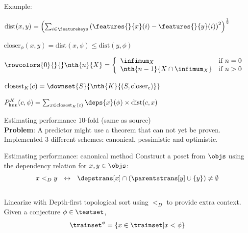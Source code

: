 \begin{frame}{Example: \knn}
	\begin{definition}
		$ \text{dist}(x, y) = \left( \sum_{i \in \featurekeys} \left( \features{}{x}(i) - \features{}{y}(i) \right)^2 \right)^{\frac{1}{2}} $
	\end{definition}
	\bigskip
	\begin{definition}
	$ \text{closer}_\phi(x, y) = \text{dist}(x, \phi) \leq \text{dist}(y, \phi) $
	\end{definition}
	\bigskip
	\begin{definition}
	$
	\rowcolors{0}{}{}
    \nth{n}{X} = \left\{
      \begin{array}{ll}
        \infimum_X & \text{if}~n = 0 \\
        \nth{n-1}{X \cap \infimum_X} & \text{if}~n > 0 \\
      \end{array}
    \right.
	$
	\end{definition}
	\bigskip
	\begin{definition}
	$
    \text{closest}_K(c) = \downset{S}{\nth{K}{(S, \text{closer}_c)}}
	$
	\end{definition}
	\pause
	\bigskip
	\begin{definition}[\knn]
	$
    	P^K_\text{knn}(c, \phi) = \sum_{x \in \text{closest}_K(c)} \deps{x}(\phi) \times \text{dist}(c, x)
	$
	\end{definition}
\end{frame}

\begin{frame}{Estimating performance}
	10-fold \crossvalidation (same as source)\\
	\bigskip
	\textbf{Problem}: A predictor might use a theorem that can not yet be proven.\\
	\bigskip
	Implemented 3 different schemes: canonical, pessimistic and optimistic.
\end{frame}

\begin{frame}{Estimating performance: canonical method}
	Construct a poset from $\objs$ using the dependency relation for $x, y \in \objs$:
	\[ x <_D y ~~\leftrightarrow~~ \depstrans[x] \cap (\parentstrans[y] \cup \{y\}) \neq \emptyset \]\\
	Linearize with Depth-first topological sort using $<_D$ to provide extra context.\\
	\bigskip
	Given a conjecture $\phi \in \testset$,
	\[ \trainset^{\phi} = \{ x \in \trainset | x < \phi \} \]
\end{frame}

